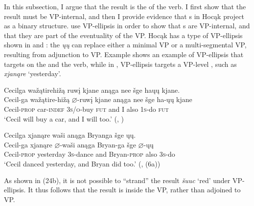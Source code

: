 \documentclass[output=paper]{LSP/langsci}
\begin{document}
In this subsection, I argue that the result  is the  of the verb. I first show that the result  must be VP-internal, and then I provide evidence that s in Hocąk project as a binary structure. \citet{LevinRappaportHovav1995} use VP-ellipsis in order to show that s are VP-internal, and that they are part of the eventuality of the VP. Hocąk has a type of VP-ellipsis shown in  and : the  \textit{ųų} can replace either a minimal VP or a multi-segmental VP, resulting from adjunction to VP. Example  shows an example of VP-ellipsis that targets on the  and the verb, while in , VP-ellipsis targets a VP-level , such as \textit{xjanąre} `yesterday'.

\begin{exe}
\ex \label{ex:rosen:22}
\glll Cecilga {\ob}{\sVP} wažątirehižą ruwį{\cb} kjane anąga nee šge {\ob}haųų{\cb} kjane.\\
Cecil-ga {} wažątire-hižą {$\varnothing$}-ruwį kjane anąga nee šge ha-ųų kjane\\
Cecil-\textsc{prop} {} car-\textsc{indef} \textsc{3s/o}-buy \textsc{fut} and I also \textsc{1s}-do \textsc{fut}\\
\glt `Cecil will buy a car, and I will too.' (\citealt{Johnson2013}, )

\ex \label{ex:rosen:23}
\glll Cecilga {\ob}{\sVP} xjanąre waši{\cb} anąga Bryanga šge {\ob}ųų{\cb}.\\
Cecil-ga {} xjanąre {$\varnothing$}-waši anąga Bryan-ga šge {$\varnothing$}-ųų\\
Cecil-\textsc{prop} {} yesterday \textsc{3s}-dance and Bryan-\textsc{prop} also \textsc{3s}-do\\
\glt `Cecil danced yesterday, and Bryan did too.' (\citealt{Johnson2013}, (6a))

\end{exe}

As shown in (24b), it is not possible to ``strand'' the result  \textit{šuuc} `red' under VP-ellipsis. It thus follows that the result is inside the VP, rather than adjoined to VP.
\end{document}
